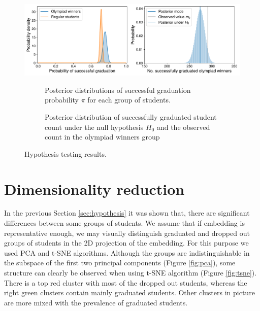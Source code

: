 \documentclass{article}
\begin{document}
\begin{figure}[t!]
  \centering
  \includegraphics[width=1\linewidth,trim={0.5cm 0 0 0}]{../gfx/testing_fig.pdf}
  \hfill
  \begin{subfigure}{0.48\textwidth}
    \centering
    \caption{Posterior distributions of successful graduation probability $\pi$ for each group of students.}
    \label{fig:test_1}
  \end{subfigure}
  \hfill
  \begin{subfigure}{0.49\textwidth}
    \centering
    \caption{Posterior distribution of successfully graduated student count under the null hypothesis $H_0$ and the observed count in the olympiad winners group}
    \label{fig:test_2}
  \end{subfigure}
  \hfill
  \captionsetup{belowskip=-15pt}
  \caption{Hypothesis testing results.}
  \label{fig:testing}

\end{figure}



\section{Dimensionality reduction}
\label{sec:reduction}
In the previous Section \ref{sec:hypothesis} it was shown that, there are significant differences between some groups of students. We assume that if embedding is representative enough, we may visually distinguish graduated and dropped out groups of students in the 2D projection of the embedding. For this purpose we used PCA and t-SNE \cite{van2008visualizing} algorithms. Although the groups are indistinguishable in the subspace of the first two principal components (Figure \ref{fig:pca}), some structure can clearly be observed when using t-SNE algorithm (Figure \ref{fig:tsne}). There is a top red cluster with most of the dropped out students, whereas the right green clusters contain mainly graduated students. Other clusters in picture are more mixed with the prevalence of graduated students.
\end{document}
